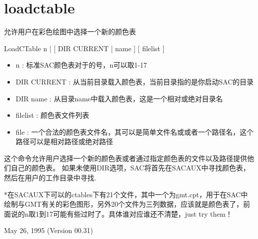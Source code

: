 \section{loadctable}
\label{cmd:loadctable}

允许用户在彩色绘图中选择一个新的颜色表

LoadCTable n | [ DIR CURRENT | name ] [ filelist ]

\begin{itemize}
\item n : 标准SAC颜色表对于的号，n可以取1-17
\item DIR CURRENT : 从当前目录载入颜色表，当前目录指的是你启动SAC的目录
\item DIR name : 从目录name中载入颜色表，这是一个相对或绝对目录名 
\item filelist : 颜色表文件列表 
\item file : 一个合法的颜色表文件名，其可以是简单文件名或或者一个路径名，这个路径可以是相对路径或绝对路径 
\end{itemize}

这个命令允许用户选择一个新的颜色表或者通过指定颜色表的文件以及路径提供他们自己的颜色表。
如果未使用DIR选项，SAC将首先在SACAUX中寻找颜色表，然后在用户的工作目录中寻找.

*在SACAUX下可以的ctables下有21个文件，其中一个为gmt.cpt，用于在SAC中绘制与GMT有关的彩色图形，另外20个文件为三列数据，应该就是颜色表了，前面说的n取1到17可能有些过时了。具体谁对应谁还不清楚，just try them！

May 26, 1995 (Version 00.31)
